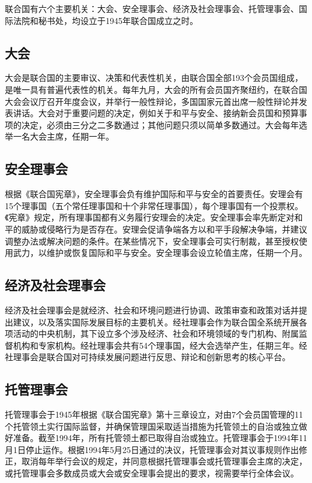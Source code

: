 \documentclass[a4paper,openany]{book}
\begin{document}
联合国有六个主要机关：大会、安全理事会、经济及社会理事会、托管理事会、国际法院和秘书处，均设立于1945年联合国成立之时。

\subsection{大会}

大会是联合国的主要审议、决策和代表性机关，由联合国全部193个会员国组成，是唯一具有普遍代表性的机关。每年九月，大会的所有会员国齐聚纽约，在联合国大会会议厅召开年度会议，并举行一般性辩论，多国国家元首出席一般性辩论并发表讲话。大会对于重要问题的决定，例如关于和平与安全、接纳新会员国和预算事项的决定，必须由三分之二多数通过；其他问题只须以简单多数通过。大会每年选举一名大会主席，任期一年。

\subsection{安全理事会}

根据《联合国宪章》，安全理事会负有维护国际和平与安全的首要责任。安理会有15个理事国（五个常任理事国和十个非常任理事国），每个理事国有一个投票权。《宪章》规定，所有理事国都有义务履行安理会的决定。安全理事会率先断定对和平的威胁或侵略行为是否存在。安理会促请争端各方以和平手段解决争端，并建议调整办法或解决问题的条件。在某些情况下，安全理事会可实行制裁，甚至授权使用武力，以维护或恢复国际和平与安全。安全理事会设立轮值主席，任期一个月。

\subsection{经济及社会理事会}
经济及社会理事会是就经济、社会和环境问题进行协调、政策审查和政策对话并提出建议，以及落实国际发展目标的主要机关。经社理事会作为联合国全系统开展各项活动的中央机制，其下设立多个涉及经济、社会和环境领域的专门机构、附属监督机构和专家机构。经社理事会共有54个理事国，经大会选举产生，任期三年。经社理事会是联合国对可持续发展问题进行反思、辩论和创新思考的核心平台。

\subsection{托管理事会}
托管理事会于1945年根据《联合国宪章》第十三章设立，对由7个会员国管理的11个托管领土实行国际监督，并确保管理国采取适当措施为托管领土的自治或独立做好准备。截至1994年，所有托管领土都已取得自治或独立。托管理事会于1994年11月1日停止运作。根据1994年5月25日通过的决议，托管理事会对其议事规则作出修正，取消每年举行会议的规定，并同意根据托管理事会或托管理事会主席的决定，或托管理事会多数成员或大会或安全理事会提出的要求，视需要举行全体会议。
\end{document}
